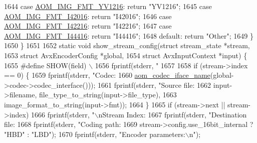 \begin{DoxyCodeInclude}
{{{{{{{{{{{{{{{{{{{{{{{{{1644     \textcolor{keywordflow}{case} \hyperlink{aom__image_8h_a930317c04b4bd0a660bb5e744055523ca6d845490a6333fca3ac22cc1105deadd}{AOM\_IMG\_FMT\_YV1216}: \textcolor{keywordflow}{return} \textcolor{stringliteral}{"YV1216"};
1645     \textcolor{keywordflow}{case} \hyperlink{aom__image_8h_a930317c04b4bd0a660bb5e744055523ca20a9cf30277260685642b4cfb4e9273b}{AOM\_IMG\_FMT\_I42016}: \textcolor{keywordflow}{return} \textcolor{stringliteral}{"I42016"};
1646     \textcolor{keywordflow}{case} \hyperlink{aom__image_8h_a930317c04b4bd0a660bb5e744055523ca064683ed4260fc6244af6cfc9d261c22}{AOM\_IMG\_FMT\_I42216}: \textcolor{keywordflow}{return} \textcolor{stringliteral}{"I42216"};
1647     \textcolor{keywordflow}{case} \hyperlink{aom__image_8h_a930317c04b4bd0a660bb5e744055523cab9b93d397dedbdd6bfafec84d1f8f0f5}{AOM\_IMG\_FMT\_I44416}: \textcolor{keywordflow}{return} \textcolor{stringliteral}{"I44416"};
1648     \textcolor{keywordflow}{default}: \textcolor{keywordflow}{return} \textcolor{stringliteral}{"Other"};
1649   \}
1650 \}
1651 
1652 \textcolor{keyword}{static} \textcolor{keywordtype}{void} show\_stream\_config(\textcolor{keyword}{struct} stream\_state *stream,
1653                                \textcolor{keyword}{struct} AvxEncoderConfig *global,
1654                                \textcolor{keyword}{struct} AvxInputContext *input) \{
1655 \textcolor{preprocessor}{#define SHOW(field) \(\backslash\)}
1656 \textcolor{preprocessor}{  fprintf(stderr, "    %
1657 
1658   \textcolor{keywordflow}{if} (stream->index == 0) \{
1659     fprintf(stderr, \textcolor{stringliteral}{"Codec: %
1660             \hyperlink{group__codec_ga013b1f6d96b2cf9489396311a7e5179b}{aom\_codec\_iface\_name}(global->codec->codec\_interface()));
1661     fprintf(stderr, \textcolor{stringliteral}{"Source file: %
1662             input->filename, file\_type\_to\_string(input->file\_type),
1663             image\_format\_to\_string(input->fmt));
1664   \}
1665   \textcolor{keywordflow}{if} (stream->next || stream->index)
1666     fprintf(stderr, \textcolor{stringliteral}{"\(\backslash\)nStream Index: %
1667   fprintf(stderr, \textcolor{stringliteral}{"Destination file: %
1668   fprintf(stderr, \textcolor{stringliteral}{"Coding path: %
1669           stream->config.use\_16bit\_internal ? \textcolor{stringliteral}{"HBD"} : \textcolor{stringliteral}{"LBD"});
1670   fprintf(stderr, \textcolor{stringliteral}{"Encoder parameters:\(\backslash\)n"});
}}}}}}}}}}}}}}}}}}}}}}}}}}}}}}}
\end{DoxyCodeInclude}
